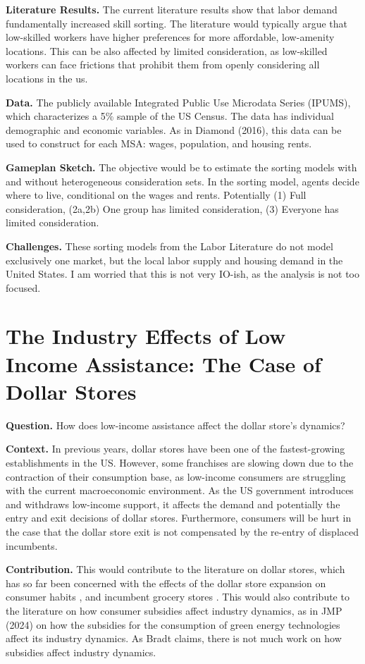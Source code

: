 \documentclass[11pt]{article}
\begin{document}
\textbf{Literature Results.} The current literature results show that labor demand fundamentally increased skill sorting. The literature would typically argue that low-skilled workers have higher preferences for more affordable, low-amenity locations. This can be also affected by limited consideration, as low-skilled workers can face frictions that prohibit them from openly considering all locations in the us. 

\textbf{Data.} The publicly available Integrated Public Use Microdata Series (IPUMS), which characterizes a 5\% sample of the US Census. The data has individual demographic and economic variables. As in Diamond (2016), this data can be used to construct for each MSA: wages, population, and housing rents. 

\textbf{Gameplan Sketch.} The objective would be to estimate the sorting models with and without heterogeneous consideration sets. In the sorting model, agents decide where to live, conditional on the wages and rents. Potentially (1) Full consideration, (2a,2b) One group has limited consideration, (3) Everyone has limited consideration.

\textbf{Challenges.} These sorting models from the Labor Literature do not model exclusively one market, but the local labor supply and housing demand in the United States. I am worried that this is not very IO-ish, as the analysis is not too focused. 




\section{The Industry Effects of Low Income Assistance: The Case of Dollar Stores}



\textbf{Question.} How does low-income assistance affect the dollar store's dynamics? 

\textbf{Context.} In previous years, dollar stores have been one of the fastest-growing establishments in the US. However, some franchises are slowing down due to the contraction of their consumption base, as low-income consumers are struggling with the current macroeconomic environment. As the US government introduces and withdraws low-income support, it affects the demand and potentially the entry and exit decisions of dollar stores. Furthermore, consumers will be hurt in the case that the dollar store exit is not compensated by the re-entry of displaced incumbents.


\textbf{Contribution.} This would contribute to the literature on dollar stores, which has so far been concerned with the effects of the dollar store expansion on consumer habits \cite{schneier2023buck}, and incumbent grocery stores \cite{caoui2022impact}.  This would also contribute to the literature on how consumer subsidies affect industry dynamics, as in \citeauthor{bradt2023policy} JMP (2024) on how the subsidies for the consumption of green energy technologies affect its industry dynamics. As Bradt claims, there is not much work on how subsidies affect industry dynamics. 
\end{document}
